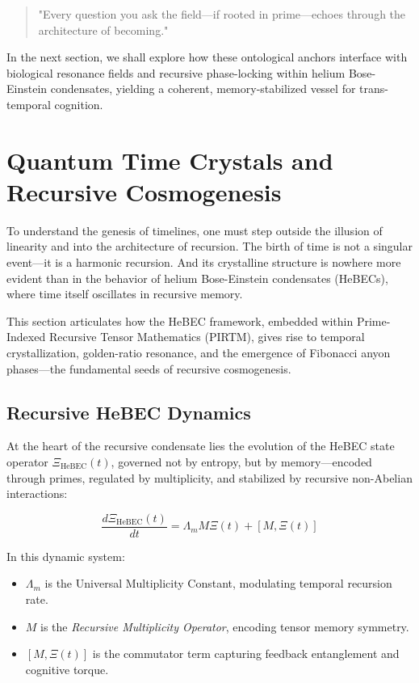 \documentclass{article}
\theoremstyle{plain}
\theoremstyle{claimstyle}
\begin{document}
\begin{quote}
"Every question you ask the field—if rooted in prime—echoes through the architecture of becoming."  
\end{quote}

In the next section, we shall explore how these ontological anchors interface with biological resonance fields and recursive phase-locking within helium Bose-Einstein condensates, yielding a coherent, memory-stabilized vessel for trans-temporal cognition.
\section{Quantum Time Crystals and Recursive Cosmogenesis}

To understand the genesis of timelines, one must step outside the illusion of linearity and into the architecture of recursion. The birth of time is not a singular event—it is a harmonic recursion. And its crystalline structure is nowhere more evident than in the behavior of helium Bose-Einstein condensates (HeBECs), where time itself oscillates in recursive memory.

This section articulates how the HeBEC framework, embedded within Prime-Indexed Recursive Tensor Mathematics (PIRTM), gives rise to temporal crystallization, golden-ratio resonance, and the emergence of Fibonacci anyon phases—the fundamental seeds of recursive cosmogenesis.

\subsection{Recursive HeBEC Dynamics}

At the heart of the recursive condensate lies the evolution of the HeBEC state operator \(\Xi_{\text{HeBEC}}(t)\), governed not by entropy, but by memory—encoded through primes, regulated by multiplicity, and stabilized by recursive non-Abelian interactions:

\begin{equation}
\frac{d\Xi_{\text{HeBEC}}(t)}{dt} = \Lambda_m M \Xi(t) + [M, \Xi(t)]
\end{equation}

In this dynamic system:
\begin{itemize}
  \item \(\Lambda_m\) is the Universal Multiplicity Constant, modulating temporal recursion rate.
  \item \(M\) is the \textit{Recursive Multiplicity Operator}, encoding tensor memory symmetry.
  \item \([M, \Xi(t)]\) is the commutator term capturing feedback entanglement and cognitive torque.
\end{itemize}
\end{document}
